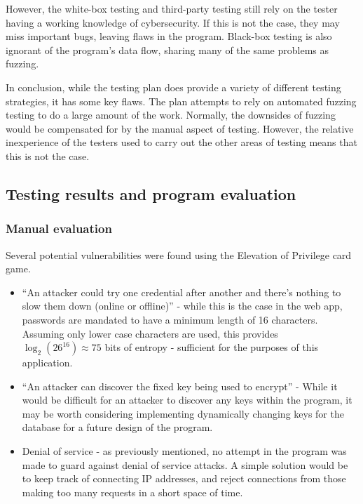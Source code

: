 However, the white-box testing and third-party testing still rely on the tester having a working knowledge of cybersecurity. If this is not the case, they may miss important bugs, leaving flaws in the program. Black-box testing is also ignorant of the program's data flow, sharing many of the same problems as fuzzing.

In conclusion, while the testing plan does provide a variety of different testing strategies, it has some key flaws. The plan attempts to rely on automated fuzzing testing to do a large amount of the work. Normally, the downsides of fuzzing would be compensated for by the manual aspect of testing. However, the relative inexperience of the testers used to carry out the other areas of testing means that this is not the case.

\subsection{Testing results and program evaluation}

\subsubsection{Manual evaluation}

Several potential vulnerabilities were found using the Elevation of Privilege card game.

\begin{itemize}

    \item ``An attacker could try one credential after another and there’s nothing to slow them down (online or offline)'' - while this is the case in the web app, passwords are mandated to have a minimum length of 16 characters. Assuming only lower case characters are used, this provides $ \log_2 ({26}^{16}) \approx 75 $ bits of entropy - sufficient for the purposes of this application.

    \item ``An attacker can discover the fixed key being used to encrypt'' - While it would be difficult for an attacker to discover any keys within the program, it may be worth considering implementing dynamically changing keys for the database for a future design of the program.

    \item Denial of service - as previously mentioned, no attempt in the program was made to guard against denial of service attacks. A simple solution would be to keep track of connecting IP addresses, and reject connections from those making too many requests in a short space of time.

\end{itemize}

